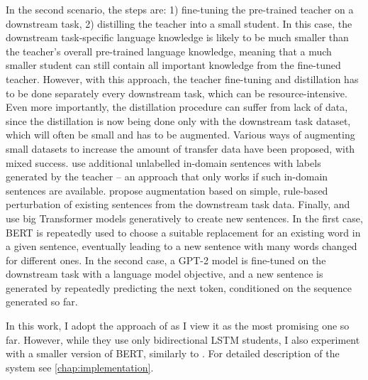 \documentclass[bsc,frontabs,twoside,singlespacing,parskip,deptreport]{infthesis}
\begin{document}
{{{      In the second scenario, the steps are: 1) fine-tuning the pre-trained teacher on a downstream task, 2) distilling the teacher into a small student. 
      In this case, the downstream task-specific language knowledge is likely to be much smaller than the teacher's overall pre-trained language knowledge, meaning that a much smaller student can still contain all important knowledge from the fine-tuned teacher. 
      However, with this approach, the teacher fine-tuning and distillation has to be done separately every downstream task, which can be resource-intensive.
      Even more importantly, the distillation procedure can suffer from lack of data, since the distillation is now being done only with the downstream task dataset, which will often be small and has to be augmented.
      Various ways of augmenting small datasets to increase the amount of transfer data have been proposed, with mixed success. 
      \citet{Mukherjee_2019} use additional unlabelled in-domain sentences with labels generated by the teacher -- an approach that only works if such in-domain sentences are available. \citet{Tang_2019a} propose augmentation based on simple, rule-based perturbation of existing sentences from the downstream task data. Finally, \citet{Jiao_2019} and \citet{Tang_2019b} use big Transformer models generatively to create new sentences. In the first case, BERT is repeatedly used to choose a suitable replacement for an existing word in a given sentence, eventually leading to a new sentence with many words changed for different ones. In the second case, a GPT-2 model is fine-tuned on the downstream task with a language model objective, and a new sentence is generated by repeatedly predicting the next token, conditioned on the sequence generated so far.

      In this work, I adopt the approach of \citet{Tang_2019b} as I view it as the most promising one so far. However, while they use only bidirectional LSTM students, I also experiment with a smaller version of BERT, similarly to \citet{Jiao_2019}. For detailed description of the system see \autoref{chap:implementation}.
    }
  }
  
}
\end{document}
